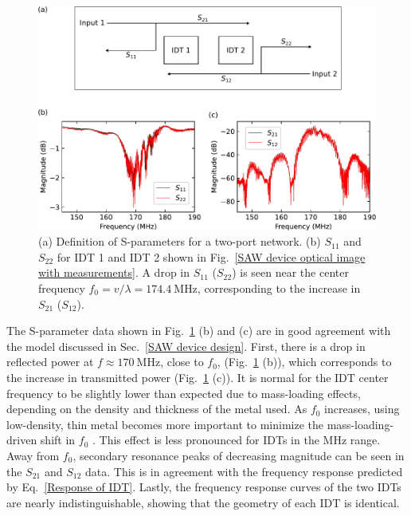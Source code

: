 \documentclass{beavtex_dub_edit}
\begin{document}
\begin{figure}
    \includegraphics[width = 1\textwidth]{S-parameters.pdf}
    \caption[(a) Definition of S-parameters for a two-port network. (b) $S_{11}$ and $S_{22}$ for IDT 1 and IDT 2 shown in Fig.\ \ref{SAW device optical image with measurements}.]{(a) Definition of S-parameters for a two-port network. (b) $S_{11}$ and $S_{22}$ for IDT 1 and IDT 2 shown in Fig.\ \ref{SAW device optical image with measurements}. A drop in $S_{11}$ ($S_{22}$) is seen near the center frequency $f_0 = v/\lambda = \SI{174.4}{\mega\hertz}$, corresponding to the increase in $S_{21}$ ($S_{12}$).}
    \label{S-parameters}
\end{figure}
The S-parameter data shown in Fig.\ \ref{S-parameters} (b) and (c) are in good agreement with the model discussed in Sec.\ \ref{SAW device design}. First, there is a drop in reflected power at $f \approx \SI{170}{\mega\hertz}$, close to $f_0$, (Fig.\ \ref{S-parameters} (b)), which corresponds to the increase in transmitted power (Fig.\ \ref{S-parameters} (c)). It is normal for the IDT center frequency to be slightly lower than expected due to mass-loading effects, depending on the density and thickness of the metal used. As $f_0$ increases, using low-density, thin metal becomes more important to minimize the mass-loading-driven shift in $f_0$ \cite{chen_ultrahigh-frequency_2020}. This effect is less pronounced for IDTs in the MHz range. Away from $f_0$, secondary resonance peaks of decreasing magnitude can be seen in the $S_{21}$ and $S_{12}$ data. This is in agreement with the frequency response predicted by Eq.\ \ref{Response of IDT}. Lastly, the frequency response curves of the two IDTs are nearly indistinguishable, showing that the geometry of each IDT is identical. 
\end{document}
